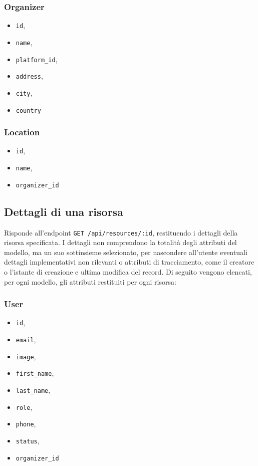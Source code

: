 \subsubsection{Organizer}
\begin{itemize}
	\item \verb|id|,
	\item \verb|name|,
	\item \verb|platform_id|,
	\item \verb|address|,
	\item \verb|city|,
	\item \verb|country|
\end{itemize}

\subsubsection{Location}
\begin{itemize}
	\item \verb|id|,
	\item \verb|name|,
	\item \verb|organizer_id|
\end{itemize}

\subsection{Dettagli di una risorsa} \label{api:dettaglio}
Risponde all'endpoint \verb|GET /api/resources/:id|, restituendo i dettagli della risorsa specificata. I dettagli non comprendono la totalità degli attributi del modello, ma un suo sottinsieme selezionato, per nascondere all'utente eventuali dettagli implementativi non rilevanti o attributi di tracciamento, come il creatore o l'istante di creazione e ultima modifica del record. Di seguito vengono elencati, per ogni modello, gli attributi restituiti per ogni risorsa:

\subsubsection{User}
\begin{itemize}
	\item \verb|id|,
	\item \verb|email|,
	\item \verb|image|,
	\item \verb|first_name|,
	\item \verb|last_name|,
	\item \verb|role|,
	\item \verb|phone|,
	\item \verb|status|,
	\item \verb|organizer_id|
\end{itemize}

